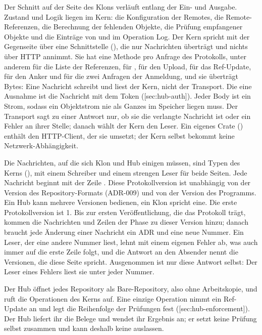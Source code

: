 Der Schnitt auf der Seite des Klons verläuft entlang der Ein- und Ausgabe.
Zustand und Logik liegen im Kern: die Konfiguration der Remotes, die Remote-Referenzen, die
Berechnung der fehlenden Objekte, die Prüfung empfangener Objekte und die Einträge von
 und  im Operation Log.
Der Kern spricht mit der Gegenseite über eine Schnittstelle (), die nur Nachrichten
überträgt und nichts über HTTP annimmt.
Sie hat eine Methode pro Anfrage des Protokolls, unter anderem für die Liste der Referenzen,
für , für den Upload, für das Ref-Update, für den Anker und für die zwei Anfragen
der Anmeldung, und sie überträgt Bytes: Eine Nachricht schreibt und liest der Kern, nicht der
Transport.
Die eine Ausnahme ist die Nachricht mit dem Token ([sec:hub-auth]).
Jeder Body ist ein Strom, sodass ein Objektstrom nie als Ganzes im Speicher liegen muss.
Der Transport sagt zu einer Antwort nur, ob sie die verlangte Nachricht ist oder ein Fehler an
ihrer Stelle; danach wählt der Kern den Leser.
Ein eigenes Crate () enthält den HTTP-Client, der sie umsetzt; der Kern selbst
bekommt keine Netzwerk-Abhängigkeit.

Die Nachrichten, auf die sich Klon und Hub einigen müssen, sind Typen des Kerns
(), mit einem Schreiber und einem strengen Leser für beide Seiten.
Jede Nachricht beginnt mit der Zeile .
Diese Protokollversion ist unabhängig von der Version des Repository-Formats (ADR-009) und von
der Version des Programms.
Ein Hub kann mehrere Versionen bedienen, ein Klon spricht eine.
Die erste Protokollversion ist 1.
Bis zur ersten Veröffentlichung, die das Protokoll trägt, kommen die Nachrichten und Zeilen der
Phase zu dieser Version hinzu; danach braucht jede Änderung einer Nachricht ein ADR und eine neue
Nummer.
Ein Leser, der eine andere Nummer liest, lehnt mit einem eigenen Fehler ab, was auch immer auf
die erste Zeile folgt, und die Antwort an den Absender nennt die Versionen, die diese Seite
spricht.
Ausgenommen ist nur diese Antwort selbst: Der Leser eines Fehlers liest sie unter jeder Nummer.

Der Hub öffnet jedes Repository als Bare-Repository, also ohne Arbeitskopie, und ruft die
Operationen des Kerns auf.
Eine einzige Operation nimmt ein Ref-Update an und legt die Reihenfolge der Prüfungen fest
([sec:hub-enforcement]).
Der Hub liefert ihr die Belege und wendet ihr Ergebnis an; er setzt keine Prüfung selbst
zusammen und kann deshalb keine auslassen.

